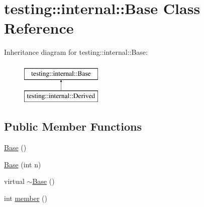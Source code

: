 \hypertarget{classtesting_1_1internal_1_1_base}{\section{testing\-:\-:internal\-:\-:Base Class Reference}
\label{classtesting_1_1internal_1_1_base}
}
Inheritance diagram for testing\-:\-:internal\-:\-:Base\-:\begin{figure}[H]
\begin{center}
\leavevmode
\includegraphics[height=2.000000cm]{classtesting_1_1internal_1_1_base}
\end{center}
\end{figure}
\subsection*{Public Member Functions}
\begin{DoxyCompactItemize}
\item 
\hyperlink{classtesting_1_1internal_1_1_base_a6b29f1a7192b126e6fa0aae31200b5ca}{Base} ()
\item 
\hyperlink{classtesting_1_1internal_1_1_base_a255d105410a1eeb5f4690c9c8cd8e104}{Base} (int n)
\item 
virtual \hyperlink{classtesting_1_1internal_1_1_base_afb29c9032fb50cc6520014aad9d68328}{$\sim$\-Base} ()
\item 
int \hyperlink{classtesting_1_1internal_1_1_base_a7ddba6221b56613be545544b7ef6214c}{member} ()
\end{DoxyCompactItemize}



